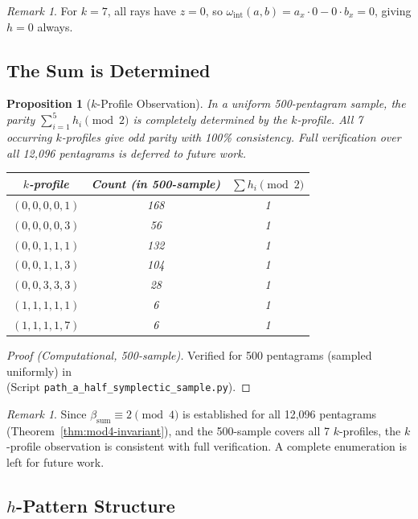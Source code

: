 \documentclass[11pt,a4paper]{article}
\newtheorem{proposition}[theorem]{Proposition}
\theoremstyle{remark}
\newtheorem{remark}[theorem]{Remark}
\begin{document}
\begin{remark}
For $k=7$, all rays have $z=0$, so $\omega_{\mathrm{int}}(a,b) = a_x \cdot 0 - 0 \cdot b_x = 0$, giving $h=0$ always.
\end{remark}

\subsection{The Sum is Determined}

\begin{proposition}[$k$-Profile Observation]\label{thm:kprofile}
In a uniform 500-pentagram sample, the parity $\sum_{i=1}^5 h_i \pmod{2}$ is completely determined by the $k$-profile.
All 7 occurring $k$-profiles give odd parity with 100\% consistency.
Full verification over all 12{,}096 pentagrams is deferred to future work.
\begin{center}
\begin{tabular}{ccc}
\toprule
$k$-profile & Count (in 500-sample) & $\sum h_i \pmod{2}$ \\
\midrule
$(0,0,0,0,1)$ & 168 & 1 \\
$(0,0,0,0,3)$ & 56 & 1 \\
$(0,0,1,1,1)$ & 132 & 1 \\
$(0,0,1,1,3)$ & 104 & 1 \\
$(0,0,3,3,3)$ & 28 & 1 \\
$(1,1,1,1,1)$ & 6 & 1 \\
$(1,1,1,1,7)$ & 6 & 1 \\
\bottomrule
\end{tabular}
\end{center}
\end{proposition}

\begin{proof}[Proof (Computational, 500-sample)]
Verified for 500 pentagrams (sampled uniformly) in\\
\cite{PaperXIIIsuppl} (Script \texttt{path\_a\_half\_symplectic\_sample.py}).
\end{proof}

\begin{remark}
Since $\beta_{\mathrm{sum}} \equiv 2 \pmod{4}$ is established for all 12{,}096 pentagrams
(Theorem~\ref{thm:mod4-invariant}), and the 500-sample covers all 7 $k$-profiles, the
$k$-profile observation is consistent with full verification. A complete enumeration is
left for future work.
\end{remark}

\subsection{\texorpdfstring{$h$-Pattern Structure}{h-Pattern Structure}}
\end{document}
